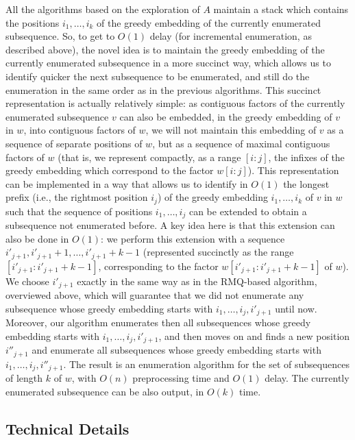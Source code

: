 \documentclass[10pt,a4paper]{amsart}
\theoremstyle{plain}
\theoremstyle{definition}
\begin{document}
All the algorithms based on the exploration of $A$ maintain a stack which contains the positions $i_1,\ldots,i_k$ of the greedy embedding of the currently enumerated subsequence. So, to get to $O(1)$ delay (for incremental enumeration, as described above), the novel idea is to maintain the greedy embedding of the currently enumerated subsequence in a more succinct way, which allows us to identify quicker the next subsequence to be enumerated, and still do the enumeration in the same order as in the previous algorithms. This succinct representation is actually relatively simple: as contiguous factors of the currently enumerated subsequence $v$ can also be embedded, in the greedy embedding of $v$ in $w$, into contiguous factors of $w$, we will not maintain this embedding of $v$ as a sequence of separate positions of $w$, but as a sequence of maximal contiguous factors of $w$ (that is, we represent compactly, as a range $[i:j]$, the infixes of the greedy embedding which correspond to the factor $w[i:j]$). This representation can be implemented in a way that allows us to identify in $O(1)$ the longest prefix (i.e., the rightmost position $i_j$) of the greedy embedding $i_1,\ldots, i_k$ of $v$ in $w$ such that the sequence of positions $i_1,\ldots, i_j$ can be extended to obtain a subsequence not enumerated before. A key idea here is that this extension can also be done in $O(1)$: we perform this extension with a sequence $i'_{j+1},i'_{j+1}+1,\ldots, i'_{j+1}+k-1 $ (represented succinctly as the range $[i'_{j+1}:i'_{j+1}+k-1 ]$, corresponding to the factor $w[i'_{j+1}: i'_{j+1}+k-1]$ of $w$). We choose $i'_{j+1}$ exactly in the same way as in the RMQ-based algorithm, overviewed above, which will guarantee that we did not enumerate any subsequence whose greedy embedding starts with $i_1,\ldots, i_j, i'_{j+1}$ until now. Moreover, our algorithm enumerates then all subsequences whose greedy embedding starts with $i_1,\ldots, i_j, i'_{j+1}$, and then moves on and finds a new position $i''_{j+1}$ and enumerate all subsequences whose greedy embedding starts with $i_1,\ldots, i_j, i''_{j+1}$. 
The result is an enumeration algorithm for the set of subsequences of length $k$ of $w$, with $O(n)$ preprocessing time and $O(1)$ delay. The currently enumerated subsequence can be also output, in $O(k)$ time. 

\subsection{Technical Details}\label{sec:enum_tech_details}
\end{document}
